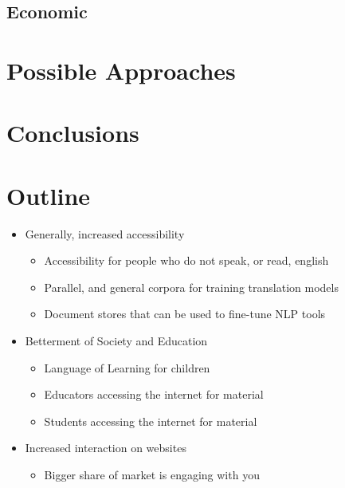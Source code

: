 \documentclass[11pt]{article}
\begin{document}
\subsection{Economic}

\section{Possible Approaches}

\section{Conclusions}

\section{Outline}

\begin{itemize}
    \item Generally, increased accessibility
        \begin{itemize}
            \item Accessibility for people who do not speak, or read, english
            \item Parallel, and general corpora for training translation models
            \item Document stores that can be used to fine-tune NLP tools
        \end{itemize}
    \item Betterment of Society and Education
        \begin{itemize}
            \item Language of Learning for children
            \item Educators accessing the internet for material 
            \item Students accessing the internet for material
        \end{itemize}

    \item Increased interaction on websites
        \begin{itemize}
            \item Bigger share of market is engaging with you
        \end{itemize}

\end{itemize}
\end{document}
